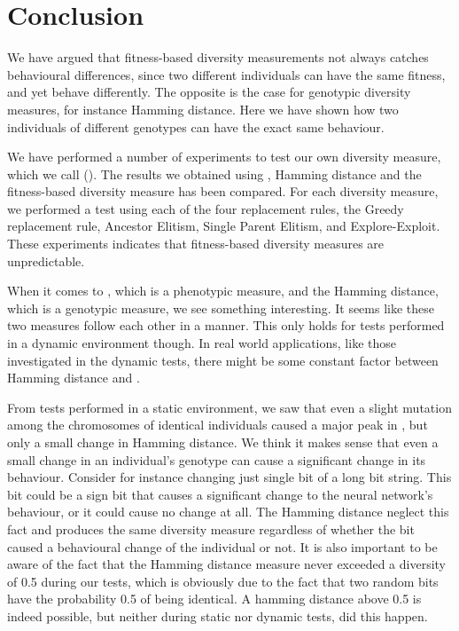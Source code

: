 \section{Conclusion}\label{sec:conclusion}
We have argued that fitness-based diversity measurements not always catches behavioural differences, since two different individuals can have the same fitness, and yet behave differently.
The opposite is the case for genotypic diversity measures, for instance Hamming distance.
Here we have shown how two individuals of different genotypes can have the exact same behaviour.

We have performed a number of experiments to test our own diversity measure, which we call \di{} (\dia{}).
The results we obtained using \dia{}, Hamming distance and the fitness-based diversity measure has been compared.
For each diversity measure, we performed a test using each of the four replacement rules, the Greedy replacement rule, Ancestor Elitism, Single Parent Elitism, and Explore-Exploit.
These experiments indicates that fitness-based diversity measures are unpredictable.

When it comes to \dia{}, which is a phenotypic measure, and the Hamming distance, which is a genotypic measure, we see something interesting. It seems like these two measures follow each other in a manner.
This only holds for tests performed in a dynamic environment though. 
In real world applications, like those investigated in the dynamic tests, there might be some constant factor between Hamming distance and \dia{}.

From tests performed in a static environment, we saw that even a slight mutation among the chromosomes of identical individuals caused a major peak in \dia{}, but only a small change in Hamming distance.
We think it makes sense that even a small change in an individual's genotype can cause a significant change in its behaviour. Consider for instance changing just single bit of a long bit string. This bit could be a sign bit that causes a significant change to the neural network's behaviour, or it could cause no change at all.
The Hamming distance neglect this fact and produces the same diversity measure regardless of whether the bit caused a behavioural change of the individual or not.
It is also important to be aware of the fact that the Hamming distance measure never exceeded a diversity of \num{0.5} during our tests, which is obviously due to the fact that two random bits have the probability \num{0.5} of being identical.
A hamming distance above \num{0.5} is indeed possible, but neither during static nor dynamic tests, did this happen. 

